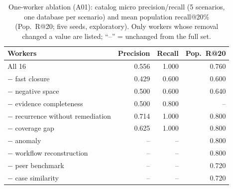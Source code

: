 \begin{table}[!htbp]
\caption{One-worker ablation (A01): catalog micro precision/recall (5
scenarios, one database per scenario) and mean population recall@20\% (Pop.\ R@20; five seeds,
exploratory). Only workers whose removal changed a value are listed; ``--'' = unchanged from the full set.}
\label{tab:ablation}
\centering
\scriptsize
\begin{tabular}{@{}L{5.4cm}rrr@{}}
\toprule
Workers & Precision & Recall & Pop.\ R@20 \\
\midrule
All 16 & 0.556 & 1.000 & 0.760 \\
$-$ fast closure & 0.429 & 0.600 & 0.600 \\
$-$ negative space & 0.500 & 0.600 & 0.640 \\
$-$ evidence completeness & 0.500 & 0.800 & -- \\
$-$ recurrence without remediation & 0.714 & 1.000 & 0.800 \\
$-$ coverage gap & 0.625 & 1.000 & 0.800 \\
$-$ anomaly & -- & -- & 0.800 \\
$-$ workflow reconstruction & -- & -- & 0.800 \\
$-$ peer benchmark & -- & -- & 0.720 \\
$-$ case similarity & -- & -- & 0.720 \\
\bottomrule
\end{tabular}
\end{table}

